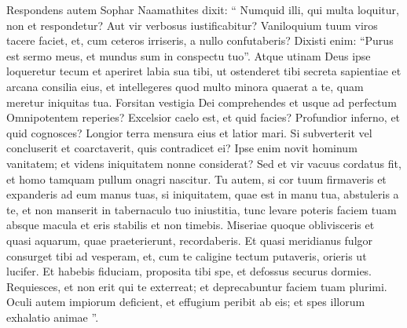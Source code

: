 \begin{biblechapter}
\begin{biblechapter}
\begin{biblechapter}
\begin{biblechapter}
\begin{biblechapter}
\begin{biblechapter}
\begin{biblechapter}
\begin{biblechapter}
\begin{biblechapter}
\begin{biblechapter}
\begin{biblechapter}
\verse Respondens autem Sophar Naamathites dixit:
 \verse “ Numquid illi, qui multa loquitur, non et respondetur?
 Aut vir verbosus iustificabitur?
 \verse Vaniloquium tuum viros tacere faciet,
 et, cum ceteros irriseris, a nullo confutaberis?
 \verse Dixisti enim: “Purus est sermo meus,
 et mundus sum in conspectu tuo”. 
\verse Atque utinam Deus ipse loqueretur tecum
 et aperiret labia sua tibi,
 \verse ut ostenderet tibi secreta sapientiae
 et arcana consilia eius,
 et intellegeres quod multo minora quaerat a te,
 quam meretur iniquitas tua.
 \verse Forsitan vestigia Dei comprehendes
 et usque ad perfectum Omnipotentem reperies?
 \verse Excelsior caelo est, et quid facies?
 Profundior inferno, et quid cognosces?
 \verse Longior terra mensura eius
 et latior mari.
 \verse Si subverterit vel concluserit et coarctaverit,
 quis contradicet ei?
 \verse Ipse enim novit hominum vanitatem;
 et videns iniquitatem nonne considerat?
 \verse Sed et vir vacuus cordatus fit,
 et homo tamquam pullum onagri nascitur.
 \verse Tu autem, si cor tuum firmaveris
 et expanderis ad eum manus tuas, 
\verse si iniquitatem, quae est in manu tua, abstuleris a te,
 et non manserit in tabernaculo tuo iniustitia,
 \verse tunc levare poteris faciem tuam absque macula
 et eris stabilis et non timebis.
 \verse Miseriae quoque oblivisceris
 et quasi aquarum, quae praeterierunt, recordaberis.
 \verse Et quasi meridianus fulgor consurget tibi ad vesperam,
 et, cum te caligine tectum putaveris, orieris ut lucifer.
 \verse Et habebis fiduciam, proposita tibi spe,
 et defossus securus dormies.
 \verse Requiesces, et non erit qui te exterreat;
 et deprecabuntur faciem tuam plurimi.
 \verse Oculi autem impiorum deficient,
 et effugium peribit ab eis;
 et spes illorum exhalatio animae ”.
 

\end{biblechapter}
\end{biblechapter}
\end{biblechapter}
\end{biblechapter}
\end{biblechapter}
\end{biblechapter}
\end{biblechapter}
\end{biblechapter}
\end{biblechapter}
\end{biblechapter}
\end{biblechapter}
